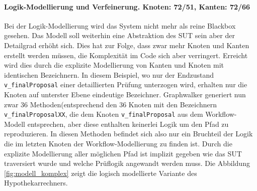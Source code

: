 \paragraph{Logik-Modellierung und Verfeinerung. Knoten: 72/51, Kanten: 72/66}
Bei der Logik-Modellierung wird das System nicht mehr als reine Blackbox gesehen. Das Modell soll weiterhin eine Abstraktion des \Gls{SUT} sein aber der Detailgrad erhöht sich. Dies hat zur Folge, dass zwar mehr Knoten und Kanten erstellt werden müssen, die Komplexität im Code sich aber verringert. Erreicht wird dies durch die explizite Modellierung von Kanten und Knoten mit identischen Bezeichnern. In diesem Beispiel, wo nur der Endzustand \texttt{v\_finalProposal} einer detaillierten Prüfung unterzogen wird, erhalten nur die Knoten auf unterster Ebene eindeutige Bezeichner. Graphwalker generiert nun zwar 36 Methoden(entsprechend den 36 Knoten mit den Bezeichnern \texttt{v\_finalProposalXX}, die dem Knoten \texttt{v\_finalProposal} aus dem Workflow-Modell entsprechen, aber diese enthalten keinerlei Logik um den Pfad zu reproduzieren. In diesen Methoden befindet sich also nur ein Bruchteil der Logik die im letzten Knoten der Workflow-Modellierung zu finden ist. Durch die explizite Modellierung aller möglichen Pfad ist implizit gegeben wie das \Gls{SUT} traversiert wurde und welche Prüflogik angewandt werden muss. Die Abbildung \ref{fig:modell_komplex} zeigt die logisch modellierte Variante des Hypothekarrechners.


